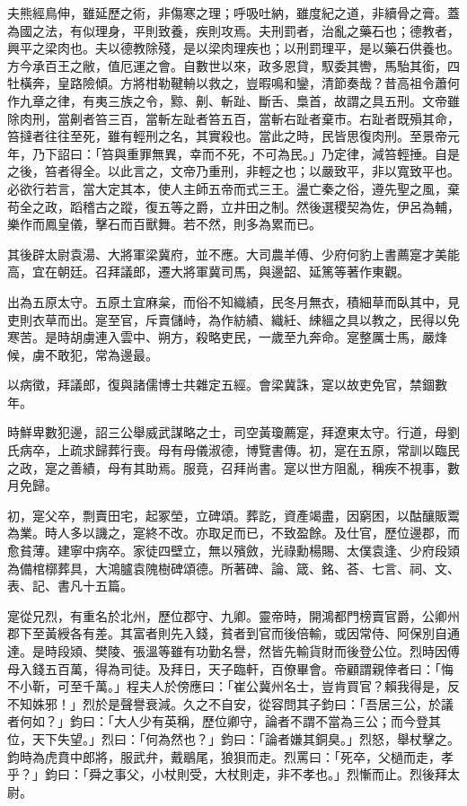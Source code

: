 \begin{pinyinscope}
夫熊經鳥伸，雖延歷之術，非傷寒之理；呼吸吐納，雖度紀之道，非續骨之膏。蓋為國之法，有似理身，平則致養，疾則攻焉。夫刑罰者，治亂之藥石也；德教者，興平之梁肉也。夫以德教除殘，是以梁肉理疾也；以刑罰理平，是以藥石供養也。方今承百王之敝，值厄運之會。自數世以來，政多恩貸，馭委其轡，馬駘其銜，四牡橫奔，皇路險傾。方將柑勒鞬輈以救之，豈暇鳴和鑾，清節奏哉？昔高祖令蕭何作九章之律，有夷三族之令，黥、劓、斬趾、斷舌、梟首，故謂之具五刑。文帝雖除肉刑，當劓者笞三百，當斬左趾者笞五百，當斬右趾者棄巿。右趾者既殞其命，笞撻者往往至死，雖有輕刑之名，其實殺也。當此之時，民皆思復肉刑。至景帝元年，乃下詔曰：「笞與重罪無異，幸而不死，不可為民。」乃定律，減笞輕捶。自是之後，笞者得全。以此言之，文帝乃重刑，非輕之也；以嚴致平，非以寬致平也。必欲行若言，當大定其本，使人主師五帝而式三王。盪亡秦之俗，遵先聖之風，棄苟全之政，蹈稽古之蹤，復五等之爵，立井田之制。然後選稷契為佐，伊呂為輔，樂作而鳳皇儀，擊石而百獸舞。若不然，則多為累而已。

其後辟太尉袁湯、大將軍梁冀府，並不應。大司農羊傅、少府何豹上書薦寔才美能高，宜在朝廷。召拜議郎，遷大將軍冀司馬，與邊韶、延篤等著作東觀。

出為五原太守。五原土宜麻枲，而俗不知織績，民冬月無衣，積細草而臥其中，見吏則衣草而出。寔至官，斥賣儲峙，為作紡績、織紝、綀縕之具以教之，民得以免寒苦。是時胡虜連入雲中、朔方，殺略吏民，一歲至九奔命。寔整厲士馬，嚴烽候，虜不敢犯，常為邊最。

以病徵，拜議郎，復與諸儒博士共雜定五經。會梁冀誅，寔以故吏免官，禁錮數年。

時鮮卑數犯邊，詔三公舉威武謀略之士，司空黃瓊薦寔，拜遼東太守。行道，母劉氏病卒，上疏求歸葬行喪。母有母儀淑德，博覽書傳。初，寔在五原，常訓以臨民之政，寔之善績，母有其助焉。服竟，召拜尚書。寔以世方阻亂，稱疾不視事，數月免歸。

初，寔父卒，剽賣田宅，起冢塋，立碑頌。葬訖，資產竭盡，因窮困，以酤釀販鬻為業。時人多以譏之，寔終不改。亦取足而已，不致盈餘。及仕官，歷位邊郡，而愈貧薄。建寧中病卒。家徒四壁立，無以殯斂，光祿勳楊賜、太僕袁逢、少府段熲為備棺槨葬具，大鴻臚袁隗樹碑頌德。所著碑、論、箴、銘、荅、七言、祠、文、表、記、書凡十五篇。

寔從兄烈，有重名於北州，歷位郡守、九卿。靈帝時，開鴻都門榜賣官爵，公卿州郡下至黃綬各有差。其富者則先入錢，貧者到官而後倍輸，或因常侍、阿保別自通達。是時段熲、樊陵、張溫等雖有功勤名譽，然皆先輸貨財而後登公位。烈時因傅母入錢五百萬，得為司徒。及拜日，天子臨軒，百僚畢會。帝顧謂親倖者曰：「悔不小靳，可至千萬。」程夫人於傍應曰：「崔公冀州名士，豈肯買官？賴我得是，反不知姝邪！」烈於是聲譽衰減。久之不自安，從容問其子鈞曰：「吾居三公，於議者何如？」鈞曰：「大人少有英稱，歷位卿守，論者不謂不當為三公；而今登其位，天下失望。」烈曰：「何為然也？」鈞曰：「論者嫌其銅臭。」烈怒，舉杖擊之。鈞時為虎賁中郎將，服武弁，戴鶡尾，狼狽而走。烈罵曰：「死卒，父檛而走，孝乎？」鈞曰：「舜之事父，小杖則受，大杖則走，非不孝也。」烈慚而止。烈後拜太尉。


\end{pinyinscope}
